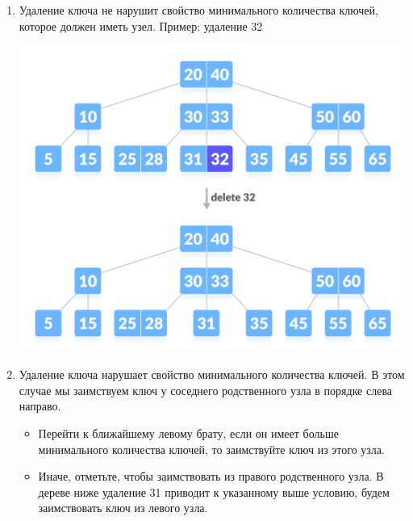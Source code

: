         \begin{enumerate}
            \item Удаление ключа не нарушит свойство минимального количества ключей, которое должен иметь узел. Пример: удаление 32 \par
            \begin{center}
                \includegraphics[width=0.8\linewidth]{удал.jpg} \par
            \end{center}
            \newpage
            \item Удаление ключа нарушает свойство минимального количества ключей. В этом случае мы заимствуем ключ у соседнего родственного узла в порядке слева направо.
            \begin{itemize}
                \item Перейти к ближайшему левому брату, если он имеет больше минимального количества ключей, то заимствуйте ключ из этого узла.
                \item Иначе, отметьте, чтобы заимствовать из правого родственного узла. В дереве ниже удаление 31 приводит к указанному выше условию, будем заимствовать ключ из левого узла.
            \end{itemize}
            \begin{center}

\end{center}
\end{enumerate}
